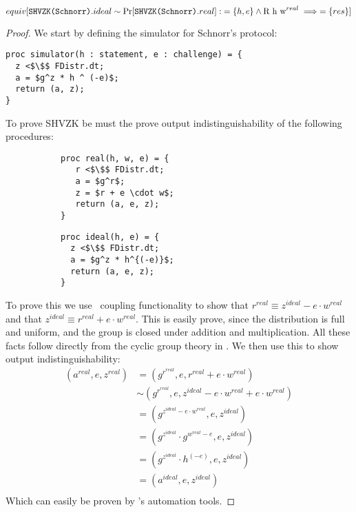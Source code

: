 \begin{lemma}
  \[
    equiv[\texttt{SHVZK(Schnorr)}.ideal \sim \operatorname{Pr}[\texttt{SHVZK(Schnorr)}.real] :\; =\{h,e\} \land \text{R h w}^{real} \implies =\{res\}]
  \]
\end{lemma}
\begin{proof}
  We start by defining the simulator for Schnorr's protocol:
\begin{lstlisting}[mathescape]
proc simulator(h : statement, e : challenge) = {
  z <$\$$ FDistr.dt;
  a = $g^z * h ^ (-e)$;
  return (a, z);
}
\end{lstlisting}
  To prove SHVZK be must the prove output indistinguishability of the following procedures:
  \begin{figure}[ht]
    \centering
    \begin{subfigure}{0.48\textwidth }
\begin{lstlisting}[mathescape]
proc real(h, w, e) = {
   r <$\$$ FDistr.dt;
   a = $g^r$;
   z = $r + e \cdot w$;
   return (a, e, z);
}
\end{lstlisting}
    \end{subfigure}
    \hfill
    \begin{subfigure}{0.48\textwidth }
\begin{lstlisting}[mathescape]
proc ideal(h, e) = {
  z <$\$$ FDistr.dt;
  a = $g^z * h^{(-e)}$;
  return (a, e, z);
}
\end{lstlisting}
    \end{subfigure}
  \end{figure}
  To prove this we use \easycrypt\ coupling functionality to show that $r^{real} \equiv z^{ideal} - e \cdot w^{real}$ and that $z^{ideal} \equiv r^{real} + e \cdot w^{real}$.
  This is easily prove, since the distribution is full and uniform, and the group is closed under addition and multiplication. All these facts follow directly from the cyclic group theory in \easycrypt.
  We then use this to show output indistinguishability:
  \begin{align*}
    (a^{real}, e, z^{real}) &= (g^{r^{real}}, e, r^{real} + e \cdot w^{real}) \\
                          &\sim (g^{r^{real}}, e, z^{ideal} - e \cdot w^{real} + e \cdot w^{real}) \\
                          &= (g^{z^{ideal} - e \cdot w^{real}}, e, z^{ideal}) \\
                          &= (g^{z^{ideal}} \cdot g^{w^{real} - e}, e, z^{ideal}) \\
                          &= (g^{z^{ideal}} \cdot h^{(-e)}, e, z^{ideal}) \\
                          &= (a^{ideal}, e, z^{ideal}) \\
  \end{align*}
  Which can easily be proven by \easycrypt's automation tools.
\end{proof}

